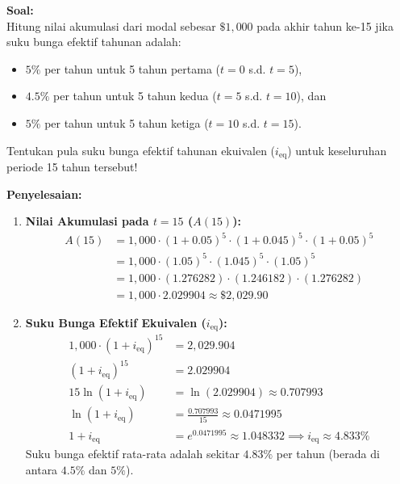 \documentclass[11pt,a4paper]{article}
\begin{document}
\begin{examplebox}
\textbf{Soal:}\\
Hitung nilai akumulasi dari modal sebesar $\$1{,}000$ pada akhir tahun ke-15 jika suku bunga efektif tahunan adalah:
\begin{itemize}
    \item $5\%$ per tahun untuk 5 tahun pertama ($t = 0$ s.d. $t = 5$),
    \item $4.5\%$ per tahun untuk 5 tahun kedua ($t = 5$ s.d. $t = 10$), dan
    \item $5\%$ per tahun untuk 5 tahun ketiga ($t = 10$ s.d. $t = 15$).
\end{itemize}
Tentukan pula suku bunga efektif tahunan ekuivalen ($i_{\text{eq}}$) untuk keseluruhan periode 15 tahun tersebut!

\vspace{0.5em}
\textbf{Penyelesaian:}\\
\begin{enumerate}[label=(\alph*)]
    \item \textbf{Nilai Akumulasi pada $t=15$ ($A(15)$):}
    \begin{align*}
        A(15) &= 1{,}000 \cdot (1 + 0.05)^5 \cdot (1 + 0.045)^5 \cdot (1 + 0.05)^5 \\
              &= 1{,}000 \cdot (1.05)^5 \cdot (1.045)^5 \cdot (1.05)^5 \\
              &= 1{,}000 \cdot (1.276282) \cdot (1.246182) \cdot (1.276282) \\
              &= 1{,}000 \cdot 2.029904 \approx \$2{,}029.90
    \end{align*}
    
    \item \textbf{Suku Bunga Efektif Ekuivalen ($i_{\text{eq}}$):}
    \begin{align*}
        1{,}000 \cdot (1 + i_{\text{eq}})^{15} &= 2{,}029.904 \\[0.4em]
        (1 + i_{\text{eq}})^{15} &= 2.029904 \\[0.4em]
        15 \ln(1 + i_{\text{eq}}) &= \ln(2.029904) \approx 0.707993 \\[0.4em]
        \ln(1 + i_{\text{eq}}) &= \frac{0.707993}{15} \approx 0.0471995 \\[0.4em]
        1 + i_{\text{eq}} &= e^{0.0471995} \approx 1.048332 \implies i_{\text{eq}} \approx 4.833\%
    \end{align*}
    Suku bunga efektif rata-rata adalah sekitar $4.83\%$ per tahun (berada di antara $4.5\%$ dan $5\%$).
\end{enumerate}
\end{examplebox}
\end{document}
